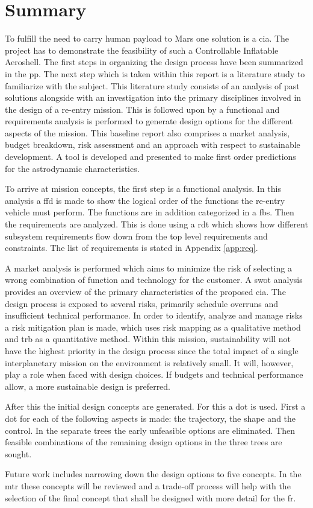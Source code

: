 \section*{Summary}\label{cha:summary}

To fulfill the need to carry human payload to Mars one solution is a \acrfull{cia}. The project has to demonstrate the feasibility of such a Controllable Inflatable Aeroshell. The first steps in organizing the design process have been summarized in the \acrfull{pp}. The next step which is taken within this report is a literature study to familiarize with the subject. This literature study consists of an analysis of past solutions alongside with an investigation into the primary disciplines involved in the design of a re-entry mission. This is followed upon by a functional and requirements analysis is performed to generate design options for the different aspects of the mission. This baseline report also comprises a market analysis, budget breakdown, risk assessment and an approach with respect to sustainable development. A tool is developed and presented to make first order predictions for the astrodynamic characteristics. 

To arrive at mission concepts, the first step is a functional analysis. In this analysis a \acrfull{ffd} is made to show the logical order of the functions the re-entry vehicle must perform. The functions are in addition categorized in a \acrfull{fbs}. Then the requirements are analyzed. This is done using a \gls{rdt} which shows how different subsystem requirements flow down from the top level requirements and constraints. The list of requirements is stated in Appendix \ref{app:req}.

A market analysis is performed which aims to minimize the risk of selecting a wrong combination of function and technology for the customer. A \acrfull{swot} analysis provides an overview of the primary characteristics of the proposed \gls{cia}. The design process is exposed to several risks, primarily schedule overruns and insufficient technical performance. In order to identify, analyze and manage risks a risk mitigation plan is made, which uses risk mapping as a qualitative method and \gls{trb} as a quantitative method. Within this mission, sustainability will not have the highest priority in the design process since the total impact of a single interplanetary mission on the environment is relatively small. It will, however, play a role when faced with design choices. If budgets and technical performance allow, a more sustainable design is preferred.

After this the initial design concepts are generated. For this a \gls{dot} is used. First a \gls{dot} for each of the following aspects is made: the trajectory, the shape and the control. In the separate trees the early unfeasible options are eliminated. Then feasible combinations of the remaining design options in the three trees are sought.

Future work includes narrowing down the design options to five concepts. In the \acrfull{mtr} these concepts will be reviewed and a trade-off process will help with the selection of the final concept that shall be designed with more detail for the \acrfull{fr}.
